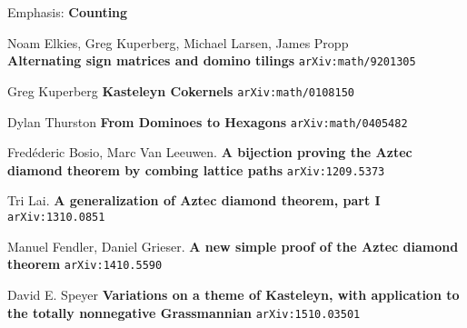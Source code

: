 \documentclass[12pt]{article}
\begin{document}
\selectfont \fontsize{12}{10}\selectfont

\begin{thebibliography}{}

\item 

\end{thebibliography}

\selectfont \fontsize{20}{25}\selectfont

\noindent Emphasis:  \textbf{Counting}


\selectfont \fontsize{12}{10}\selectfont

\begin{thebibliography}{}

\item Noam Elkies, Greg Kuperberg, Michael Larsen, James Propp  \\ \textbf{Alternating sign matrices and domino tilings} \texttt{arXiv:math/9201305}

\item Greg Kuperberg \textbf{Kasteleyn Cokernels} \texttt{arXiv:math/0108150}

\item Dylan Thurston \textbf{From Dominoes to Hexagons} \texttt{arXiv:math/0405482}

\item Fred\'{e}deric Bosio, Marc Van Leeuwen. \textbf{A bijection proving the Aztec diamond theorem by combing lattice paths} \texttt{arXiv:1209.5373}

\item Tri Lai. \textbf{A generalization of Aztec diamond theorem, part I} \texttt{arXiv:1310.0851}

\item Manuel Fendler, Daniel Grieser. \textbf{A new simple proof of the Aztec diamond theorem} \texttt{arXiv:1410.5590}

\item David E. Speyer \textbf{Variations on a theme of Kasteleyn, with application to the totally nonnegative Grassmannian} \texttt{arXiv:1510.03501}

\end{thebibliography}

\selectfont \fontsize{20}{25}\selectfont
\end{document}
